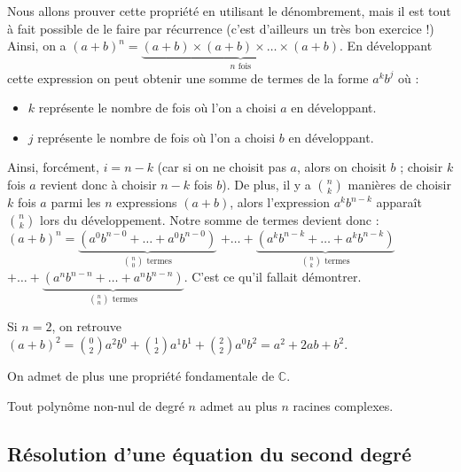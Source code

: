 	\begin{demonstration}
		\contentwidth[big]
		Nous allons prouver cette propriété en utilisant le dénombrement, mais il est tout à fait possible de le faire par récurrence (c'est d'ailleurs un très bon exercice !)
		\newpar
		Ainsi, on a $(a+b)^n = \underbrace{(a + b) \times (a + b) \times \dots \times (a + b)}_{n \text{ fois}}$.
		\newpar
		En développant cette expression on peut obtenir une somme de termes de la forme $a^k b^j$ où :
		\begin{itemize}
			\item $k$ représente le nombre de fois où l'on a choisi $a$ en développant.
			\item $j$ représente le nombre de fois où l'on a choisi $b$ en développant.
		\end{itemize}
		Ainsi, forcément, $i = n-k$ (car si on ne choisit pas $a$, alors on choisit $b$ ; choisir $k$ fois $a$ revient donc à choisir $n-k$ fois $b$).
		\newpar
		De plus, il y a $\displaystyle{\binom{n}{k}}$ manières de choisir $k$ fois $a$ parmi les $n$ expressions $(a+b)$, alors l'expression $a^k b^{n-k}$ apparaît $\displaystyle{\binom{n}{k}}$ lors du développement. Notre somme de termes devient donc :
		\newpar
		$(a+b)^n = \displaystyle{\underbrace{(a^0b^{n-0} + \dots + a^0b^{n-0})}_{\binom{n}{0} \text{ termes}}}$
		\newline
		$\displaystyle{+ \dots + \underbrace{(a^kb^{n-k} + \dots + a^kb^{n-k})}_{\binom{n}{k} \text{ termes}}}$
		\newline
		$\displaystyle{+ \dots + \underbrace{(a^nb^{n-n} + \dots + a^nb^{n-n})}_{\binom{n}{n} \text{ termes}}}$.
		\newpar
		C'est ce qu'il fallait démontrer.
	\end{demonstration}
	
	\begin{tip}
		\contentwidth[big]
		Si $n = 2$, on retrouve $\displaystyle{(a+b)^2 = \binom{0}{2} a^2 b^0 + \binom{1}{2}a^1 b^1 + \binom{2}{2} a^0 b^2} = a^2 + 2ab + b^2$.
	\end{tip}
	
	On admet de plus une propriété fondamentale de $\mathbb{C}$.
	
	\begin{formula}
		Tout polynôme non-nul de degré $n$ admet au plus $n$ racines complexes.
	\end{formula}
	
	\subsection{Résolution d'une équation du second degré}
	
